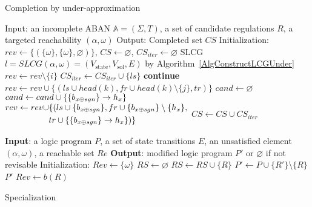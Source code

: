 \begin{algorithm}[ht]
\caption{Completion by under-approximation}\label{algComUnder}
\begin{algorithmic}
\State Input: an incomplete ABAN $\mathbb{A}=(\Sigma,T)$, a set of candidate regulations $R$, a targeted reachability $(\alpha,\omega)$
\State Output: Completed set $CS$ %
\State Initialization: $rev\gets\{(\{\omega\},\{\omega\},\varnothing)\}$, $CS\gets \varnothing$, $CS_{iter}\gets \varnothing$
\Do
\State SLCG $l=SLCG(\alpha,\omega)=(V_{\mathrm{state}},V_{\mathrm{sol}}, E)$ by Algorithm~\ref{AlgConstructLCGUnder}
        \State $rev\gets rev \setminus\{i\}$
            \State $CS_{iter}\gets CS_{iter}\cup \{ls\}$
            \State \textbf{continue}
        \EndIf
                    \State $rev\gets rev\cup \{(ls\cup head(k), fr\cup head(k)\setminus \{j\},tr)\}$
                \EndIf
            \EndFor
        \EndFor
        \State $cand\gets\varnothing$
                \State $cand \gets cand\cup\{\acm{b_{x \oplus sgn}}{h_{1-x}}{h_x}\}$
                \State 
                    $\begin{aligned}
                        rev\gets rev\cup &\{(ls\cup \{b_{x \oplus sgn}\}, fr\cup \{b_{x \oplus sgn}\}\setminus \{h_x\},\\
                        &tr\cup\{\acm{b_{x \oplus sgn}}{h_{1-x}}{h_x}\})\}
                    \end{aligned}$
            \EndIf
        \EndFor
    \EndFor
\EndWhile
\State $CS\gets CS\cup CS_{iter}$
\State {}
\end{algorithmic}
\end{algorithm}

\begin{algorithm}[ht]
\begin{algorithmic}
    \State \textbf{Input}: a logic program $P$, a set of state transitions $E$, an unsatisfied element $(\alpha,\omega)$, a reachable set $Re$
    \State \textbf{Output}: modified logic program $P'$ or $\varnothing$ if not revisable
    \State Initialization: $Rev\gets\{\omega\}$
    \Do
    \State $RS\gets \varnothing$
            \State $RS\gets RS\cup \{R\}$
        \EndIf
    \EndFor
            \State $P'\gets P\cup \{R'\}\setminus \{R\}$
                    \State\Return $P'$
                \EndIf
            \EndIf
        \EndFor
    \EndFor
        \State $Rev\gets b(R)$
    \EndFor
\end{algorithmic}
\caption{Specialization}\label{alg:specialization}
\end{algorithm}

